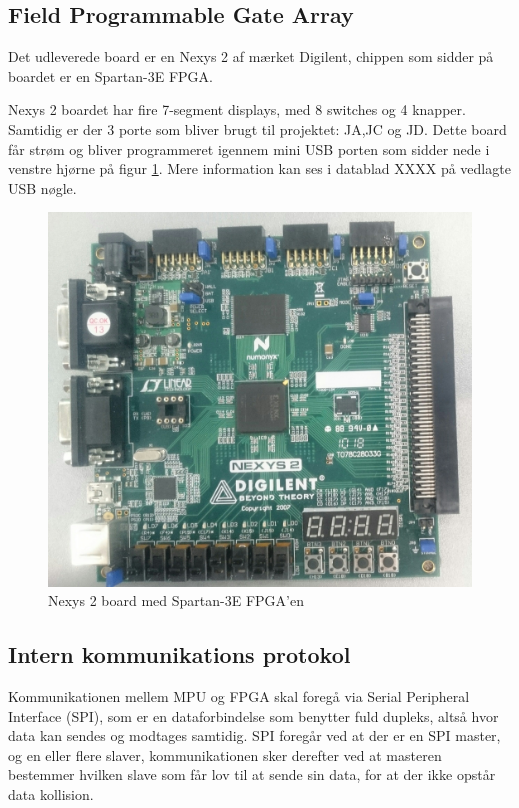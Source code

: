 \subsection{Field Programmable Gate Array}

Det udleverede board er en Nexys 2 af mærket Digilent, chippen som sidder på boardet er en Spartan-3E FPGA.

Nexys 2 boardet har fire 7-segment displays, med 8 switches og 4 knapper. Samtidig er der 3 porte som bliver brugt til projektet: JA,JC og JD.
Dette board får strøm og bliver programmeret igennem mini USB porten som sidder nede i venstre hjørne på figur \ref{fig:Nexys2Board}.
Mere information kan ses i datablad XXXX på vedlagte USB nøgle.

\begin{figure}[!ht]
	\begin{center}
		\includegraphics[scale=0.08, angle =0]{Billeder/Nexys2Board.JPG}
	\end{center}
\caption{Nexys 2 board med Spartan-3E FPGA'en}
\label{fig:Nexys2Board}
\end{figure}

\subsection{Intern kommunikations protokol}
Kommunikationen mellem MPU og FPGA skal foregå via Serial Peripheral Interface (SPI), som er en dataforbindelse som benytter fuld dupleks, altså hvor data kan sendes og modtages samtidig.
SPI foregår ved at der er en SPI master, og en eller flere slaver, kommunikationen sker derefter ved at masteren bestemmer hvilken slave som får lov til at sende sin data, for at der ikke opstår data kollision.

